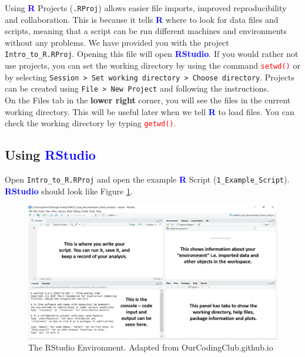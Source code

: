\documentclass[a4paper,12pt]{article}
\newcommand\boldblue[1]{\textcolor{blue}{\textbf{#1}}}
\newcommand\code[1]{\textcolor{red}{\texttt{#1}}}
\begin{document}
Using \boldblue{R} Projects (\texttt{.RProj}) allows easier file imports, improved reproducibility and collaboration. This is because it tells \boldblue{R} where to look for data files and scripts, meaning that a script can be run different machines and environments without any problems. We have provided you with the project \texttt{Intro\_to\_R.RProj}. Opening this file will open \boldblue{RStudio}. If you would rather not use projects, you can set the working directory by using the command \code{setwd()} or by selecting \texttt{Session > Set working directory > Choose directory}. Projects can be created using \texttt{File > New Project} and following the instructions. \\

On the Files tab in the \textbf{lower right} corner, you will see the files in the current working directory. This will be useful later when we tell \boldblue{R} to load files. You can check the working directory by typing \code{getwd()}.



\subsection {Using \boldblue{RStudio}}

Open \texttt{Intro\_to\_R.RProj} and open the example \boldblue{R} Script (\texttt{1\_Example\_Script}). \boldblue{RStudio} should look like Figure \ref{fig:R_Studio}. 
\\

\begin{figure}[h]
	\centering 
	\includegraphics[width=1.1\textwidth]{figs/R_Studio.png}
	\caption{The RStudio Environment. Adapted from OurCodingClub.github.io}
	\label{fig:R_Studio}
\end{figure} 
\end{document}
